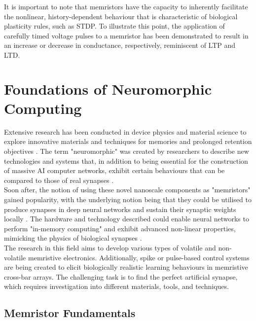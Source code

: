 \noindent It is important to note that memristors have the capacity to inherently facilitate the nonlinear, history-dependent behaviour that is characteristic of biological plasticity rules, such as STDP. To illustrate this point, the application of carefully timed voltage pulses to a memristor has been demonstrated to result in an increase or decrease in conductance, respectively, reminiscent of LTP and LTD.

\section[Foundations of Neuromorphic Computing]{Foundations of Neuromorphic Computing}

Extensive research has been conducted in device physics and material science to explore innovative materials and techniques for memories and prolonged retention objectives \cite{indiveri2021introducing}. The term "neuromorphic" was created by researchers to describe new technologies and systems that, in addition to being essential for the construction of massive AI computer networks, exhibit certain behaviours that can be compared to those of real synapses \cite{di2009circuit}. \\

\noindent Soon after, the notion of using these novel nanoscale components as "memristors" gained popularity, with the underlying notion being that they could be utilised to produce synapses in deep neural networks and sustain their synaptic weights locally \cite{jo2010nanoscale}. The hardware and technology described could enable neural networks to perform "in-memory computing" and exhibit advanced non-linear properties, mimicking the physics of biological synapses \cite{saighi2015plasticity}. \\

\noindent The research in this field aims to develop various types of volatile and non-volatile memristive electronics. Additionally, spike or pulse-based control systems are being created to elicit biologically realistic learning behaviours in memristive cross-bar arrays. The challenging task is to find the perfect artificial synapse, which requires investigation into different materials, tools, and techniques.

\subsection[Memristor Fundamentals]{Memristor Fundamentals}

